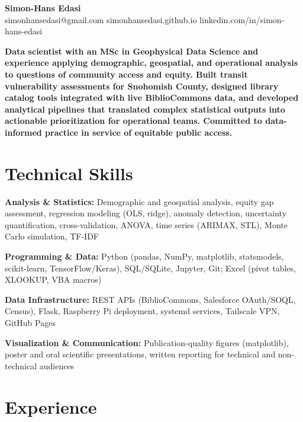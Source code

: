 \documentclass[11pt,a4paper]{article}
\begin{document}
\begin{center}
    {\LARGE \textbf{Simon-Hans Edasi}} \\[6pt]
    simonhansedasi@gmail.com \hfill \textbar \hfill
    simonhansedasi.github.io \hfill \textbar \hfill
    linkedin.com/in/simon-hans-edasi
\end{center}

\vspace{0.3cm}

\noindent
\textbf{Data scientist with an MSc in Geophysical Data Science and experience applying demographic, geospatial, and operational analysis to questions of community access and equity. Built transit vulnerability assessments for Snohomish County, designed library catalog tools integrated with live BiblioCommons data, and developed analytical pipelines that translated complex statistical outputs into actionable prioritization for operational teams. Committed to data-informed practice in service of equitable public access.}

\section*{Technical Skills}

\noindent
\textbf{Analysis \& Statistics:} Demographic and geospatial analysis, equity gap assessment, regression modeling (OLS, ridge), anomaly detection, uncertainty quantification, cross-validation, ANOVA, time series (ARIMAX, STL), Monte Carlo simulation, TF-IDF

\noindent
\textbf{Programming \& Data:} Python (pandas, NumPy, matplotlib, statsmodels, scikit-learn, TensorFlow/Keras), SQL/SQLite, Jupyter, Git; Excel (pivot tables, XLOOKUP, VBA macros)

\noindent
\textbf{Data Infrastructure:} REST APIs (BiblioCommons, Salesforce OAuth/SOQL, Census), Flask, Raspberry Pi deployment, systemd services, Tailscale VPN, GitHub Pages

\noindent
\textbf{Visualization \& Communication:} Publication-quality figures (matplotlib), poster and oral scientific presentations, written reporting for technical and non-technical audiences

\section*{Experience}
\end{document}
